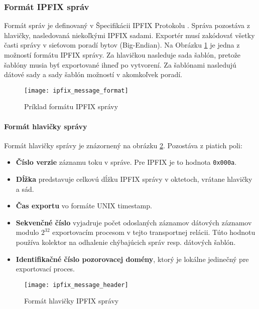 \subsubsection{Formát IPFIX správ} \label{sec:message_format}

Formát správ je definovaný v Špecifikácii IPFIX Protokolu \citep{rfc5101}. Správa pozostáva z 
hlavičky, nasledovaná niekoľkými IPFIX sadami. 
Exportér musí zakódovať všetky časti správy v sieťovom poradí bytov (Big-Endian).
Na Obrázku \ref{o:ipfix_message_format} je jedna z možností formátu IPFIX správy. Za hlavičkou nasleduje sada šablón, pretože
šablóny musia byť exportované ihneď po vytvorení. Za šablónami nasledujú dátové sady a sady šablón možností 
v akomkoľvek poradí.

\begin{figure}[ht!]
\centering
\texttt{[image: ipfix\_message\_format]}
\caption{Príklad formátu IPFIX správy}\label{o:ipfix_message_format}
\end{figure}



\paragraph{Formát hlavičky správy}

Formát hlavičky správy je znázornený na obrázku \ref{o:ipfix_message_header}. Pozostáva z piatich poli:
\begin{itemize}
 \item \textbf{Číslo verzie} záznamu toku v správe. Pre IPFIX je to hodnota \verb|0x000a|.
 \item \textbf{Dĺžka} predstavuje celkovú dĺžku IPFIX správy v oktetoch, vrátane hlavičky a sád. 
 \item \textbf{Čas exportu} vo formáte UNIX timestamp. 
 \item \textbf{Sekvenčné číslo} vyjadruje počet odoslaných záznamov dátových záznamov modulo $2^{32}$  
 exportovacím procesom v tejto transportnej relácii. Túto hodnotu používa kolektor na odhalenie chýbajúcich 
 správ resp. dátových šablón.
 \item \textbf{Identifikačné číslo pozorovacej domény}, ktorý je lokálne jedinečný pre exportovací proces.
 \end{itemize}
 
\begin{figure}[ht!]
\centering
\texttt{[image: ipfix\_message\_header]}
\caption{Formát hlavičky IPFIX správy}\label{o:ipfix_message_header}
\end{figure}



